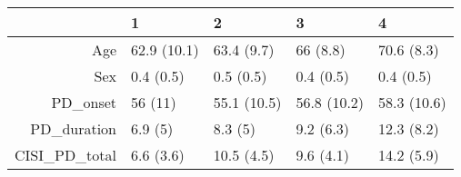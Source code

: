 \begin{table}[ht]
\centering
\begin{tabular}{rllll}
  \toprule
 & 1 & 2 & 3 & 4 \\ 
  \midrule
Age & 62.9 (10.1) & 63.4 (9.7) & 66 (8.8) & 70.6 (8.3) \\ 
  Sex & 0.4 (0.5) & 0.5 (0.5) & 0.4 (0.5) & 0.4 (0.5) \\ 
  PD\_onset & 56 (11) & 55.1 (10.5) & 56.8 (10.2) & 58.3 (10.6) \\ 
  PD\_duration & 6.9 (5) & 8.3 (5) & 9.2 (6.3) & 12.3 (8.2) \\ 
  CISI\_PD\_total & 6.6 (3.6) & 10.5 (4.5) & 9.6 (4.1) & 14.2 (5.9) \\ 
   \bottomrule
\end{tabular}
\end{table}
